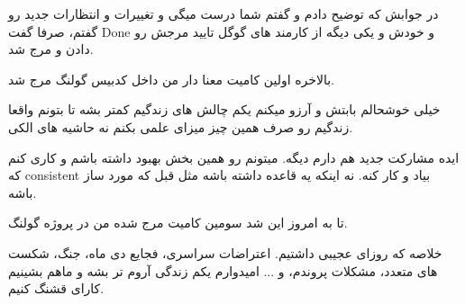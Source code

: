 در جوابش که توضیح دادم و گفتم شما درست میگی و تغییرات و انتظارات جدید رو گفتم، صرفا گفت Done و خودش و یکی دیگه از کارمند های گوگل تایید مرجش رو دادن و مرج شد.

بالاخره اولین کامیت معنا دار من داخل کدبیس گولنگ مرج شد.


خیلی خوشحالم بابتش و آرزو میکنم یکم چالش های زندگیم کمتر بشه تا بتونم واقعا زندگیم رو صرف همین چیز میزای علمی بکنم نه حاشیه های الکی.

ایده مشارکت جدید هم دارم دیگه. میتونم رو همین بخش بهبود داشته باشم و کاری کنم که consistent بیاد و کار کنه. نه اینکه یه قاعده داشته باشه مثل قبل که مورد ساز باشه.

تا به امروز این شد سومین کامیت مرج شده من در پروژه گولنگ.

خلاصه که روزای عجیبی داشتیم. اعتراضات سراسری، فجایع دی ماه، جنگ، شکست های متعدد، مشکلات پروندم، و ... امیدوارم یکم زندگی آروم تر بشه و ماهم بشینیم کارای قشنگ کنیم.


